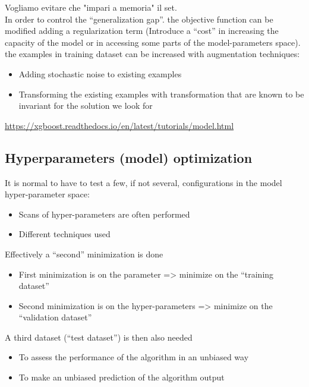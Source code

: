 Vogliamo evitare che "impari a memoria" il set.\\
In order to control the “generalization gap”. the objective function can be modified adding a regularization term (Introduce a “cost” in increasing the capacity of the model or in accessing some parts of the model-parameters space).\\

the examples in training dataset can be increased with augmentation techniques:

\begin{itemize}
	\item Adding stochastic noise to existing examples
	\item Transforming the existing examples with transformation that are known to be invariant 	for the solution we look for
\end{itemize}


\url{https://xgboost.readthedocs.io/en/latest/tutorials/model.html}



\subsection{Hyperparameters (model) optimization}

It is normal to have to test a few, if not several, configurations in the model hyper-parameter space:
\begin{itemize}
	\item Scans of hyper-parameters are often performed
	\item Different techniques used
\end{itemize}


Effectively a “second” minimization is done

\begin{itemize}
	\item First minimization is on the parameter => minimize on the “training dataset”
	\item Second minimization is on the hyper-parameters => minimize on the “validation dataset”
\end{itemize}

A third dataset (“test dataset”) is then also needed

\begin{itemize}
	\item To assess the performance of the algorithm in an unbiased way
	\item To make an unbiased prediction of the algorithm output
\end{itemize}


